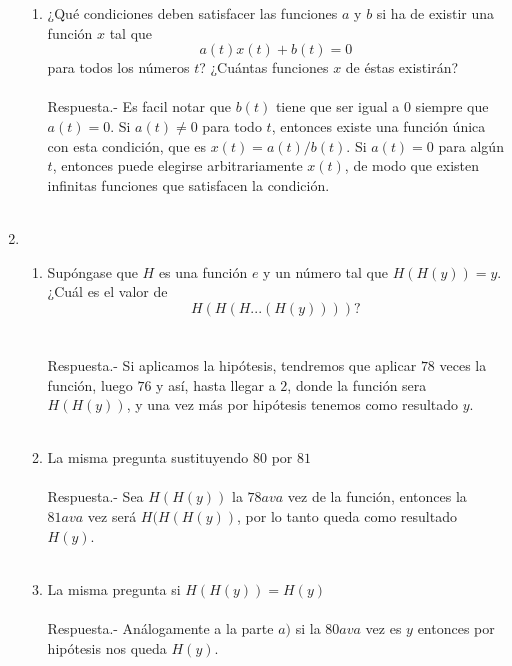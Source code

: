 \begin{enumerate}
\begin{enumerate}[\bfseries (a)]
	    \item ¿Qué condiciones deben satisfacer las funciones $a$ y $b$ si ha de existir una función $x$ tal que $$a(t)x(t)+b(t)=0$$ para todos los números $t$? ¿Cuántas funciones $x$ de éstas existirán?\\\\
	    Respuesta.-\; Es facil notar que $b(t)$ tiene que ser igual a $0$ siempre que $a(t) = 0$. Si $a(t) \neq 0$ para todo $t$, entonces existe una función única con esta condición, que es $x(t) = a(t)/b(t)$. Si $a(t)=0$ para algún $t$, entonces puede elegirse arbitrariamente $x(t)$, de modo que existen infinitas funciones que satisfacen la condición.\\\\

	\end{enumerate}

	\item 

	\begin{enumerate}[\bfseries (a)]

	    \item Supóngase que $H$ es una función $e$ y un número tal que $H(H(y))=y$. ¿Cuál es el valor de $$H(H(H...(H(y))))?$$\\\\
	    Respuesta.-\; Si aplicamos la hipótesis, tendremos que aplicar $78$ veces la función, luego $76$ y así, hasta llegar a $2$, donde la función sera $H(H(y))$, y una vez más por hipótesis tenemos como resultado $y$.\\\\

	    \item La misma pregunta sustituyendo $80$ por $81$\\\\
	    Respuesta.-\; Sea $H(H(y))$ la $78ava$ vez de la función, entonces la $81ava$ vez será $H(H(H(y))$, por lo tanto queda como resultado $H(y)$.\\\\ 

	    \item La misma pregunta si $H(H(y))=H(y)$\\\\
	    Respuesta.-\; Análogamente a la parte $a)$ si la $80ava$ vez es $y$ entonces por hipótesis nos queda $H(y)$.\\\\ 


\end{enumerate}
\end{enumerate}
